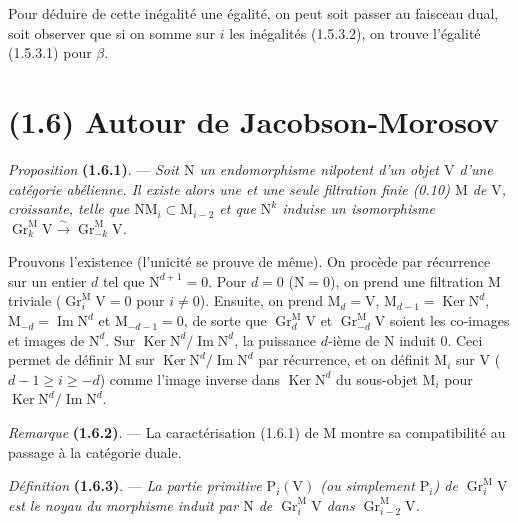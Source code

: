 \documentclass[11pt,leqno]{article}
\begin{document}
Pour déduire de cette inégalité une égalité, on peut soit passer au faisceau dual, soit observer que si on somme sur \(i\) les inégalités (1.5.3.2), on trouve l’égalité (1.5.3.1) pour \(\beta\).

\section*{(1.6) Autour de Jacobson-Morosov}

\textit{Proposition} \textbf{(1.6.1)}. — \textit{Soit \(\mathrm{N}\) un endomorphisme nilpotent d’un objet \(\mathrm{V}\) d’une catégorie abélienne. Il existe alors une et une seule filtration finie \textup{(0.10)} \(\mathrm{M}\) de \(\mathrm{V}\), croissante, telle que \(\mathrm{N}\mathrm{M}_i\subset\mathrm{M}_{i-2}\) et que \(\mathrm{N}^k\) induise un isomorphisme \(\operatorname{Gr}_k^{\mathrm{M}}\mathrm{V}\xrightarrow{\sim}\operatorname{Gr}_{-k}^{\mathrm{M}}\mathrm{V}\).}

Prouvons l’existence (l’unicité se prouve de même). On procède par récurrence sur un entier \(d\) tel que \(\mathrm{N}^{d+1}=0\). Pour \(d=0\) (\(\mathrm{N}=0\)), on prend une filtration \(\mathrm{M}\) triviale (\(\operatorname{Gr}_i^{\mathrm{M}}\mathrm{V}=0\) pour \(i\ne0\)). Ensuite, on prend \(\mathrm{M}_d=\mathrm{V}\), \(\mathrm{M}_{d-1}=\operatorname{Ker}\mathrm{N}^d\), \(\mathrm{M}_{-d}=\operatorname{Im}\mathrm{N}^d\) et \(\mathrm{M}_{-d-1}=0\), de sorte que \(\operatorname{Gr}_d^{\mathrm{M}}\mathrm{V}\) et \(\operatorname{Gr}_{-d}^{\mathrm{M}}\mathrm{V}\) soient les co-images et images de \(\mathrm{N}^d\). Sur \(\operatorname{Ker}\mathrm{N}^d/\operatorname{Im}\mathrm{N}^d\), la puissance \(d\)-ième de \(\mathrm{N}\) induit \(0\). Ceci permet de définir \(\mathrm{M}\) sur \(\operatorname{Ker}\mathrm{N}^d/\operatorname{Im}\mathrm{N}^d\) par récurrence, et on définit \(\mathrm{M}_i\) sur \(\mathrm{V}\) (\(d-1\ge i\ge-d\)) comme l’image inverse dans \(\operatorname{Ker}\mathrm{N}^d\) du sous-objet \(\mathrm{M}_i\) pour \(\operatorname{Ker}\mathrm{N}^d/\operatorname{Im}\mathrm{N}^d\).

\textit{Remarque} \textbf{(1.6.2)}. — La caractérisation (1.6.1) de \(\mathrm{M}\) montre sa compatibilité au passage à la catégorie duale.

\textit{Définition} \textbf{(1.6.3)}. — \textit{La \textup{partie primitive} \(\mathrm{P}_i(\mathrm{V})\) (ou simplement \(\mathrm{P}_i\)) de \(\operatorname{Gr}_i^{\mathrm{M}}\mathrm{V}\) est le noyau du morphisme induit par \(\mathrm{N}\) de \(\operatorname{Gr}_i^{\mathrm{M}}\mathrm{V}\) dans \(\operatorname{Gr}_{i-2}^{\mathrm{M}}\mathrm{V}\).}
\end{document}
